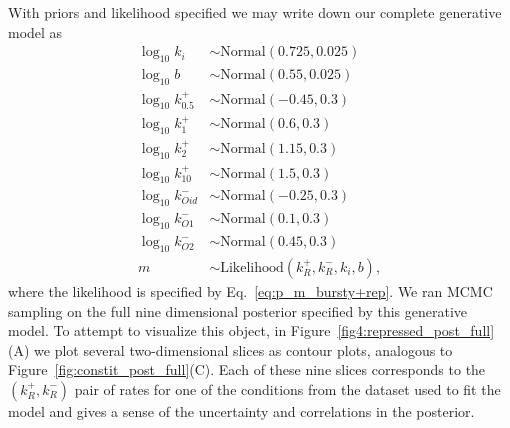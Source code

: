 With priors and likelihood specified we may write down our complete generative model as
\begin{equation}
\begin{split}
\log_{10}k_i &\sim \text{Normal}(0.725, 0.025)\\
\log_{10}b   &\sim \text{Normal}(0.55, 0.025)\\
\log_{10}k_{0.5}^+ &\sim \text{Normal}(-0.45, 0.3)\\
\log_{10}k_{1}^+   &\sim \text{Normal}(0.6, 0.3)\\
\log_{10}k_{2}^+   &\sim \text{Normal}(1.15, 0.3)\\
\log_{10}k_{10}^+  &\sim \text{Normal}(1.5, 0.3)\\
\log_{10}k_{Oid}^- &\sim \text{Normal}(-0.25, 0.3)\\
\log_{10}k_{O1}^-  &\sim \text{Normal}(0.1, 0.3)\\
\log_{10}k_{O2}^-  &\sim \text{Normal}(0.45, 0.3)\\
m &\sim \text{Likelihood}(k_R^+, k_R^-, k_i, b),
\end{split}
\end{equation}
where the likelihood is specified by Eq.~\ref{eq:p_m_bursty+rep}.
We ran MCMC sampling on the full nine dimensional posterior
specified by this generative model. To attempt to visualize this
object, in Figure~\ref{fig4:repressed_post_full}(A) we plot
several two-dimensional slices as contour plots, analogous to
Figure~\ref{fig:constit_post_full}(C). Each of these nine slices
corresponds to the $(k_R^+, k_R^-)$ pair of rates for one of the
conditions from the dataset used to fit the model and gives a
sense of the uncertainty and correlations in the posterior.


